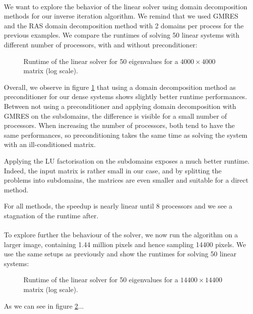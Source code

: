 \paragraph{}
We want to explore the behavior of the linear solver using domain decomposition methods for our inverse iteration algorithm.
We remind that we used GMRES and the RAS domain decomposition method with 2 domains per process for the previous examples.
We compare the runtimes of solving 50 linear systems with different number of processors, with and without preconditioner:

\begin{figure}[H]
 \centering
 
 \caption{Runtime of the linear solver for 50 eigenvalues for a \(4000 \times 4000\) matrix (log scale).}
 \label{fig:linear_solver}
\end{figure}

Overall, we observe in figure \ref{fig:linear_solver} that using a domain decomposition method as preconditioner for our dense systems shows slightly better runtime performances.
Between not using a preconditioner and applying domain decomposition with GMRES on the subdomains, the difference is visible for a small number of processors.
When increasing the number of processors, both tend to have the same performances, so preconditioning takes the same time as solving the system with an ill-conditioned matrix.

Applying the LU factorisation on the subdomains exposes a much better runtime.
Indeed, the input matrix is rather small in our case, and by splitting the problems into subdomains, the matrices are even smaller and suitable for a direct method.

For all methods, the speedup is nearly linear until 8 processors and we see a stagnation of the runtime after.

\paragraph{}
To explore further the behaviour of the solver, we now run the algorithm on a larger image, containing 1.44 million pixels and hence sampling 14400 pixels.
We use the same setups as previously and show the runtimes for solving 50 linear systems:

\begin{figure}[H]
 \centering
 
 \caption{Runtime of the linear solver for 50 eigenvalues for a \(14400 \times 14400\) matrix (log scale).}
 \label{fig:linear_solver_big}
\end{figure}

As we can see in figure \ref{fig:linear_solver_big}...
